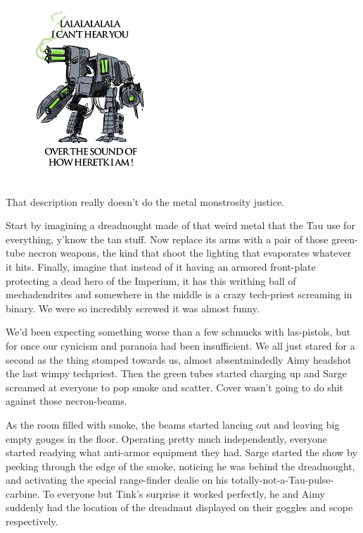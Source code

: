 \begin{figure}
	\begin{center}
		\includegraphics[width=\figwidth]{pics/11/78.png}
	\end{center}
\end{figure}
That description really doesn't do the metal monstrosity justice. 


Start by imagining a dreadnought made of that weird metal that the Tau use for everything, y'know the tan stuff. 
Now replace its arms with a pair of those green-tube necron weapons, the kind that shoot the lighting that evaporates whatever it hits. 
Finally, imagine that instead of it having an armored front-plate protecting a dead hero of the Imperium, it has this writhing ball of mechadendrites and somewhere in the middle is a crazy tech-priest screaming in binary. 
We were so incredibly screwed it was almost funny.

We'd been expecting something worse than a few schmucks with las-pistols, but for once our cynicism and paranoia had been insufficient. 
We all just stared for a second as the thing stomped towards us, almost absentmindedly Aimy headshot the last wimpy techpriest. 
Then the green tubes started charging up and Sarge screamed at everyone to pop smoke and scatter. 
Cover wasn't going to do shit against those necron-beams.

As the room filled with smoke, the beams started lancing out and leaving big empty gouges in the floor. 
Operating pretty much independently, everyone started readying what anti-armor equipment they had. 
Sarge started the show by peeking through the edge of the smoke, noticing he was behind the dreadnought, and activating the special range-finder dealie on his totally-not-a-Tau-pulse-carbine. 
To everyone but Tink's surprise it worked perfectly, he and Aimy suddenly had the location of the dreadnaut displayed on their goggles and scope respectively. 


